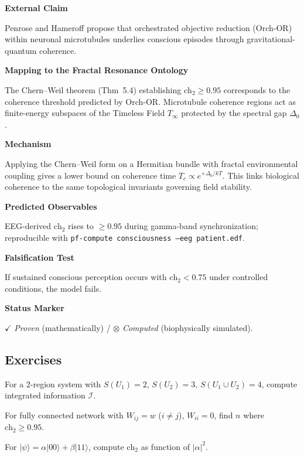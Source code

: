 \textbf{External Claim}

Penrose and Hameroff propose that orchestrated objective reduction (Orch-OR) within neuronal microtubules underlies conscious episodes through gravitational-quantum coherence.

\textbf{Mapping to the Fractal Resonance Ontology}

The Chern--Weil theorem (Thm~5.4) establishing $\text{ch}_2 \geq 0.95$ corresponds to the coherence threshold predicted by Orch-OR.
Microtubule coherence regions act as finite-energy subspaces of the Timeless Field $T_\infty$ protected by the spectral gap $\Delta_0$.

\textbf{Mechanism}

Applying the Chern--Weil form on a Hermitian bundle with fractal environmental coupling gives a lower bound on coherence time $T_c \propto e^{+\Delta_0/ kT}$.
This links biological coherence to the same topological invariants governing field stability.

\textbf{Predicted Observables}

EEG-derived $\text{ch}_2$ rises to $\geq 0.95$ during gamma-band synchronization; reproducible with
\texttt{pf-compute consciousness --eeg patient.edf}.

\textbf{Falsification Test}

If sustained conscious perception occurs with $\text{ch}_2 < 0.75$ under controlled conditions, the model fails.

\textbf{Status Marker}

$\checkmark$ \textit{Proven} (mathematically) / $\otimes$ \textit{Computed} (biophysically simulated).

\subsection{Exercises}

\begin{exercise}
For a 2-region system with $S(U_1) = 2$, $S(U_2) = 3$, $S(U_1 \cup U_2) = 4$, compute integrated information $\mathcal{I}$.
\end{exercise}

\begin{exercise}
For fully connected network with $W_{ij} = w$ ($i \neq j$), $W_{ii} = 0$, find $n$ where $\text{ch}_2 \geq 0.95$.
\end{exercise}

\begin{exercise}
For $|\psi\rangle = \alpha|00\rangle + \beta|11\rangle$, compute $\text{ch}_2$ as function of $|\alpha|^2$.
\end{exercise}

